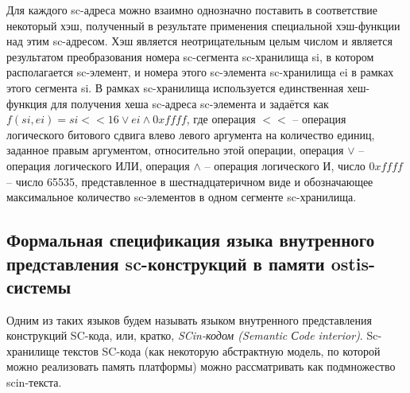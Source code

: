 Для каждого sc-адреса можно взаимно однозначно поставить в соответствие некоторый хэш, полученный в результате применения специальной хэш-функции над этим sc-адресом. Хэш является неотрицательным целым числом и является результатом преобразования номера sc-сегмента sc-хранилища si, в котором располагается sc-элемент, и номера этого sc-элемента sc-хранилища ei в рамках этого сегмента si. В рамках sc-хранилища используется единственная хеш-функция для получения хеша sc-адреса sc-элемента и задаётся как $f(si, ei) = si << 16 \vee ei \wedge 0xffff$, где операция $<<$ -- операция логического битового сдвига влево левого аргумента на количество единиц, заданное правым аргументом, относительно этой операции, операция $\vee$ -- операция логического ИЛИ, операция $\wedge$ -- операция логического И, число $0xffff$ -- число 65535, представленное в шестнадцатеричном виде и обозначающее максимальное количество sc-элементов в одном сегменте sc-хранилища.

\begin{SCn}
\end{SCn}

\subsection{Формальная спецификация языка внутренного представления sc-конструкций в памяти ostis-системы}

Одним из таких языков будем называть языком внутренного представления конструкций SC-кода, или, кратко, \textit{SCin-кодом (Semantic Сode interior)}. Sc-хранилище текстов SC-кода (как некоторую абстрактную модель, по которой можно реализовать память платформы) можно рассматривать как подмножество scin-текста.

\begin{SCn}
\begin{scnindent}
\end{scnindent}
\end{SCn}

